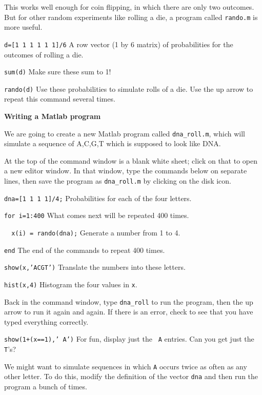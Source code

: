 This works well enough for coin flipping, in which there are only two
outcomes.  But for other random experiments like rolling a die, a program
called {\tt rando.m} is more useful.

\item {\tt d=[1 1 1 1 1 1]/6} \hfill A row vector (1 by 6 matrix)
of probabilities for the outcomes of rolling a die.
\item {\tt sum(d)} \hfill Make sure these sum to 1!
\item {\tt rando(d)} \hfill Use these probabilities to simulate rolls of a
die.  Use the up arrow to repeat this command several times.

\hspace*{-0.5in}
{\bf Writing a Matlab program}

We are going to create a new Matlab program called {\tt dna\_roll.m}, which
will simulate a sequence of A,C,G,T which is supposed to look like DNA.

At the top of the command window is a blank white sheet; click on that to
open a new editor window.
In that window, type the commands below on separate lines, then save the
program as {\tt dna\_roll.m} by clicking on the disk icon.

\item {\tt dna=[1 1 1 1]/4;} \hfill Probabilities for each of the four letters.
\item {\tt for i=1:400} \hfill What comes next will be repeated 400 times.
\item {\tt ~~x(i) = rando(dna);} \hfill Generate a number from 1 to 4.
\item {\tt end} \hfill The end of the commands to repeat 400 times.
\item {\tt show(x,'ACGT')} \hfill Translate the numbers into these letters.
\item {\tt hist(x,4)} \hfill Histogram the four values in {\tt x}.

Back in the command window, type {\tt dna\_roll} to run the program, then
the up arrow to run it again and again.
If there is an error, check to see that you have typed everything correctly.

\item {\tt show(1+(x==1),' A')} \hfill For fun, display just the {\tt
A} entries.  Can you get just the {\tt T}'s?

We might want to simulate sequences in which {\tt A} occurs twice as
often as any other letter.
To do this, modify the definition of the vector {\tt dna} and then run the
program a bunch of times.

